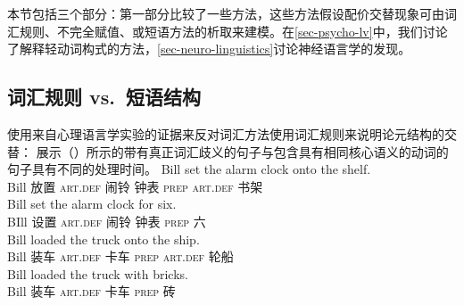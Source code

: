 \begin{exe}
\begin{xlist}[iv.]
\begin{exe}
\begin{xlist}[iv.]
本节包括三个部分：第一部分比较了一些方法，这些方法假设配价交替现象可由词汇规则、不完全赋值、或短语方法的析取来建模。在\ref{sec-psycho-lv}中，我们讨论了解释轻动词构式的方法，\ref{sec-neuro-linguistics}讨论神经语言学的发现。

\subsection{词汇规则 vs.\ 短语结构}
\label{sec-lr-phrasal-psycho}
\mbox{} \citet[\S~1.4.5]{Goldberg95a}使用来自心理语言学实验的证据来反对词汇方法使用词汇规则来说明论元结构的交替： \citet{CT88a}展示（）所示的带有真正词汇歧义的句子与包含具有相同核心语义的动词的句子具有不同的处理时间。
\eal
\ex
\gll Bill set the alarm clock onto the shelf.\\
     Bill 放置 \textsc{art}.\textsc{def} 闹铃 钟表 \textsc{prep} \textsc{art}.\textsc{def} 书架\\
\ex
\gll Bill set the alarm clock for six.\\
     BIll 设置 \textsc{art}.\textsc{def} 闹铃 钟表 \textsc{prep} 六\\
\zl
\eal
\ex
\gll Bill loaded the truck onto the ship.\\
     Bill 装车 \textsc{art}.\textsc{def} 卡车 \textsc{prep} \textsc{art}.\textsc{def} 轮船\\
\ex
\gll Bill loaded the truck with bricks.\\
     Bill 装车 \textsc{art}.\textsc{def} 卡车 \textsc{prep} 砖\\

\end{xlist}
\end{exe}
\end{xlist}
\end{exe}

